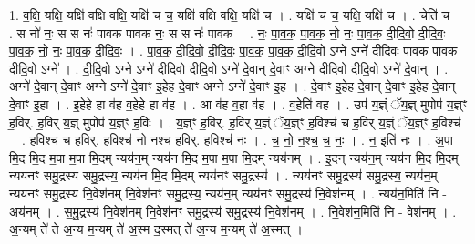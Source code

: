 \documentclass[17pt]{extarticle}
\begin{document}
1. व॒क्षि॒ यक्षि॒ यक्षि॑ वक्षि वक्षि॒ यक्षि॑ च च॒ यक्षि॑ वक्षि वक्षि॒ यक्षि॑ च । . यक्षि॑ च च॒ यक्षि॒ यक्षि॑ च । . चेति॑ च । . स नो॑ नः॒ स स नः॑ पावक पावक नः॒ स स नः॑ पावक । . नः॒ पा॒व॒क॒ पा॒व॒क॒ नो॒ नः॒ पा॒व॒क॒ दी॒दि॒वो॒ दी॒दि॒वः॒ पा॒व॒क॒ नो॒ नः॒ पा॒व॒क॒ दी॒दि॒वः॒ । . पा॒व॒क॒ दी॒दि॒वो॒ दी॒दि॒वः॒ पा॒व॒क॒ पा॒व॒क॒ दी॒दि॒वो ऽग्ने ऽग्ने॑ दीदिवः पावक पावक दीदि॒वो ऽग्ने᳚ । . दी॒दि॒वो ऽग्ने ऽग्ने॑ दीदिवो दीदि॒वो ऽग्ने॑ दे॒वान् दे॒वाꣳ अग्ने॑ दीदिवो दीदि॒वो ऽग्ने॑ दे॒वान् । . अग्ने॑ दे॒वान् दे॒वाꣳ अग्ने ऽग्ने॑ दे॒वाꣳ इ॒हेह दे॒वाꣳ अग्ने ऽग्ने॑ दे॒वाꣳ इ॒ह । . दे॒वाꣳ इ॒हेह दे॒वान् दे॒वाꣳ इ॒हेह दे॒वान् दे॒वाꣳ इ॒हा । . इ॒हेहे हा व॑ह व॒हेहे हा व॑ह । . आ व॑ह व॒हा व॑ह । . व॒हेति॑ वह । . उप॑ य॒ज्ञ्ं ॅय॒ज्ञ् मुपोप॑ य॒ज्ञ्ꣳ ह॒विर्. ह॒विर् य॒ज्ञ् मुपोप॑ य॒ज्ञ्ꣳ ह॒विः । . य॒ज्ञ्ꣳ ह॒विर्. ह॒विर् य॒ज्ञ्ं ॅय॒ज्ञ्ꣳ ह॒विश्च॑ च ह॒विर् य॒ज्ञ्ं ॅय॒ज्ञ्ꣳ ह॒विश्च॑ । . ह॒विश्च॑ च ह॒विर्. ह॒विश्च॑ नो नश्च ह॒विर्. ह॒विश्च॑ नः । . च॒ नो॒ न॒श्च॒ च॒ नः॒ । . न॒ इति॑ नः । . अ॒पा मि॒द मि॒द म॒पा म॒पा मि॒दम् न्यय॑न॒म् न्यय॑न मि॒द म॒पा म॒पा मि॒दम् न्यय॑नम् । . इ॒दन् न्यय॑न॒म् न्यय॑न मि॒द मि॒दम् न्यय॑नꣳ समु॒द्रस्य॑ समु॒द्रस्य॒ न्यय॑न मि॒द मि॒दम् न्यय॑नꣳ समु॒द्रस्य॑ । . न्यय॑नꣳ समु॒द्रस्य॑ समु॒द्रस्य॒ न्यय॑न॒म् न्यय॑नꣳ समु॒द्रस्य॑ नि॒वेश॑नम् नि॒वेश॑नꣳ समु॒द्रस्य॒ न्यय॑न॒म् न्यय॑नꣳ समु॒द्रस्य॑ नि॒वेश॑नम् । . न्यय॑न॒मिति॑ नि - अय॑नम् । . स॒मु॒द्रस्य॑ नि॒वेश॑नम् नि॒वेश॑नꣳ समु॒द्रस्य॑ समु॒द्रस्य॑ नि॒वेश॑नम् । . नि॒वेश॑न॒मिति॑ नि - वेश॑नम् । . अ॒न्यम् ते॑ ते अ॒न्य म॒न्यम् ते॑ अ॒स्म द॒स्मत् ते॑ अ॒न्य म॒न्यम् ते॑ अ॒स्मत् । \newline
\end{document}
